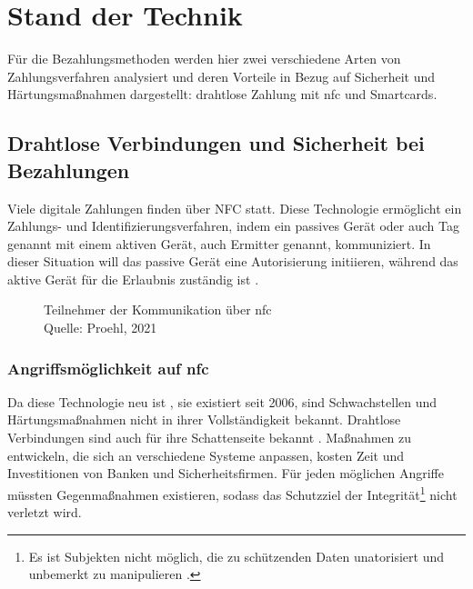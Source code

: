 \section{Stand der Technik}

Für die Bezahlungsmethoden werden hier zwei verschiedene Arten von Zahlungsverfahren analysiert und deren
Vorteile in Bezug auf Sicherheit und Härtungsmaßnahmen dargestellt: drahtlose Zahlung mit nfc und 
Smartcards.

\subsection{Drahtlose Verbindungen und Sicherheit bei Bezahlungen}

Viele digitale Zahlungen finden über NFC statt. Diese Technologie ermöglicht ein Zahlungs- und
Identifizierungsverfahren, indem ein passives Gerät oder auch Tag genannt mit einem aktiven Gerät,
auch Ermitter genannt, kommuniziert. In dieser Situation will das passive Gerät eine Autorisierung initiieren,
während das aktive Gerät für die Erlaubnis zuständig ist \cite{refart:NFNK}. 

\begin{figure}[H]
   \caption{Teilnehmer der Kommunikation über nfc\\Quelle: Proehl, 2021}
   \label{fig:refart_GPIN}
\end{figure}

\subsubsection{Angriffsmöglichkeit auf nfc}

Da diese Technologie neu ist \cite{refip:NTAS}, sie existiert seit 2006, sind Schwachstellen 
und Härtungsmaßnahmen nicht in ihrer Vollständigkeit bekannt. Drahtlose Verbindungen sind auch für ihre 
Schattenseite bekannt \cite{refip:NYRS}. Maßnahmen zu entwickeln, die sich an verschiedene Systeme anpassen,
kosten Zeit und Investitionen von Banken und Sicherheitsfirmen. Für jeden möglichen Angriffe müssten 
Gegenmaßnahmen existieren, sodass das Schutzziel der Integrität\footnote{Es ist Subjekten nicht möglich, 
die zu schützenden Daten unatorisiert und unbemerkt zu manipulieren \cite{refbook:SWIS}.} nicht verletzt wird.

